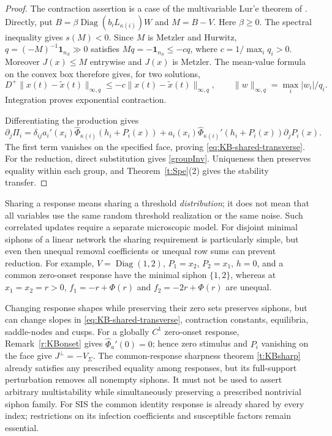 \begin{proof}
The contraction assertion is a case of the multivariable Lur'e theorem of
\cite{Davydov}. Directly, put
$B=\beta\operatorname{Diag}(b_iL_{\kappa(i)})W$ and $M=B-V$.
Here $\beta\ge0$. The spectral inequality gives $s(M)<0$.
Since $M$ is Metzler and Hurwitz,
$q=(-M)^{-1}\mathbf1_{n_S}\gg0$ satisfies
$Mq=-\mathbf1_{n_S}\le-cq$,
where $c=1/\max_iq_i>0$. Moreover $J(x)\le M$ entrywise and $J(x)$ is Metzler.
The mean-value formula on the convex box therefore gives, for two solutions,
\[
 D^+\|x(t)-\widetilde x(t)\|_{\infty,q}
 \le-c\|x(t)-\widetilde x(t)\|_{\infty,q},
 \qquad \|w\|_{\infty,q}=\max_i |w_i|/q_i.
\]
Integration proves exponential contraction.

Differentiating the production gives
\[
 \partial_j\Pi_i
 =\delta_{ij}a_i'(x_i)\widehat\Phi_{\kappa(i)}(h_i+P_i(x))
 +a_i(x_i)\widehat\Phi_{\kappa(i)}'(h_i+P_i(x))\partial_jP_i(x).
\]
The first term vanishes on the specified face, proving
\eqref{eq:KB-shared-transverse}.
For the reduction, direct substitution gives \eqref{groupInv}.
Uniqueness then preserves equality within each group, and
Theorem~\ref{t:Spe}(2) gives the stability transfer.
\end{proof}
Sharing a response means sharing a threshold \emph{distribution};
it does not mean that all variables use the same random threshold
realization or the same noise. Such correlated updates require a
separate microscopic model. For disjoint minimal siphons of a linear
network the sharing requirement is particularly simple, but even
then unequal removal coefficients or unequal row sums can prevent
reduction. For example, $V=\operatorname{Diag}(1,2)$,
$P_1=x_2$, $P_2=x_1$, $h=0$, and a common zero-onset response
have the minimal siphon $\{1,2\}$, whereas at $x_1=x_2=r>0$,
$f_1=-r+\Phi(r)$ and $f_2=-2r+\Phi(r)$ are unequal.
\eeR

Changing response shapes while preserving their zero sets preserves
siphons, but can change slopes in \eqref{eq:KB-shared-transverse},
contraction constants, equilibria, saddle-nodes and cusps. For a globally $C^1$ zero-onset response,
Remark~\ref{r:KBonset} gives $\widehat\Phi_a'(0)=0$; hence zero stimulus
and $P_i$ vanishing on the face give $J^\perp=-V_\Sigma$.
The common-response sharpness theorem
\ref{t:KBsharp} already satisfies any prescribed equality among
responses, but its full-support perturbation removes all nonempty
siphons. It must not be used to assert arbitrary multistability
while simultaneously preserving a prescribed nontrivial siphon
family. For SIS the common identity response is already shared
by every index; restrictions on its infection coefficients and
susceptible factors remain essential.
\eeR



